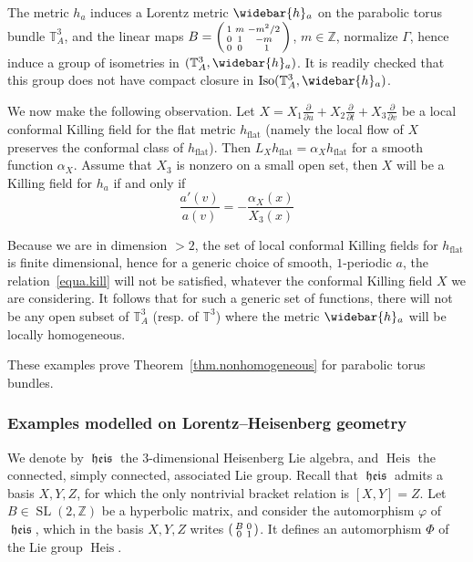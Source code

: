 \documentclass[11pt]{article}
\theoremstyle{definition}
\numberwithin{equation}{section}
\numberwithin{figure}{section}
\numberwithin{table}{section}
\DeclareMathOperator{\Iso}{Iso}
\DeclareMathOperator{\SL}{SL}
\DeclareMathOperator{\flatm}{flat}
\DeclareMathOperator{\heis}{{\mathfrak{heis}}}
\DeclareMathOperator{\Heis}{Heis}
\newcommand*\TT{\mathbb{T}}
\newcommand*\ZZ{\mathbb{Z}}
\let\oldbar\bar
\renewcommand*{\bar}[1]{\mathchoice{\widebar{#1}}{\widebar{#1}}{\oldbar{#1}}{\oldbar{#1}}}
\renewcommand*{\overline}{\bar}
\newenvironment{smallpmatrix}{\left(\begin{smallmatrix}}{\end{smallmatrix}\right)}
\newcommand*{\sfrac}[2]{#1/#2}
\begin{document}
The metric $h_a$ induces a Lorentz metric $\overline{h}_a$ on the parabolic torus bundle $\TT_A^3$, and the linear maps $ B=
\begin{smallpmatrix} 1& m & -\sfrac{m^2}{2}\\ 0 & 1 & -m \\ 0& 0 & \;\;1
\end{smallpmatrix}$, $m \in \ZZ$, normalize $\Gamma$, hence induce a group of isometries in $(\TT_A^3,\overline{h}_a)$. It is readily checked that this group does not have compact closure in $\Iso(\TT_A^3, \overline{h}_a)$.



We now make the following observation. Let $X=X_1 \frac{\partial}{\partial u} +X_2 \frac{\partial}{\partial t}+X_3 \frac{\partial}{\partial v}$ be a local conformal Killing field for the flat metric $h_{\flatm}$ (namely the local flow of $X$ preserves the conformal class of $h_{\flatm}$). Then $L_Xh_{\flatm}=\alpha_X h_{\flatm}$ for a smooth function $\alpha_X$. Assume that $X_3$ is nonzero on a small open set, then $X$ will be a Killing field for $h_a$ if and only if
\begin{equation}\label{equa.kill}
\frac{a'(v)}{a(v)}=-\frac{\alpha_X(x)}{X_3(x)}
\end{equation}

Because we are in dimension $>2$, the set of local conformal Killing fields for $h_{\flatm}$ is finite dimensional, hence for a generic choice of smooth, $1$-periodic $a$, the relation~\eqref{equa.kill} will not be satisfied, whatever the conformal Killing field $X$ we are considering. It follows that for such a generic set of functions, there will not be any open subset of $\TT_A^3$ (resp. of $\TT^3$) where the metric $\overline{h}_a$ will be locally homogeneous.

These examples prove Theorem~\ref{thm.nonhomogeneous} for parabolic torus bundles.

\subsubsection{Examples modelled on Lorentz--Heisenberg geometry}\label{sec.lorentzheisenberg}
We denote by $\heis$ the $3$-dimensional Heisenberg Lie algebra, and $\Heis$ the connected, simply connected, associated Lie group. Recall that $\heis$ admits a basis $X,Y,Z$, for which the only nontrivial bracket relation is $[X,Y]=Z$. Let $B \in \SL(2,\ZZ)$ be a hyperbolic matrix, and consider the automorphism $\varphi$ of $\heis$, which in the basis $X,Y,Z$ writes $\begin{smallpmatrix} B & 0\\ 0 & 1\end{smallpmatrix} $. It defines an automorphism $\Phi$ of the Lie group
$\Heis$.
\end{document}
